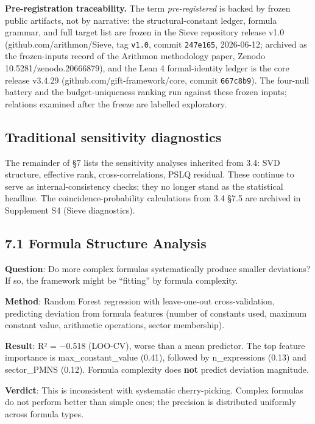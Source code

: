 \documentclass[11pt,a4paper]{article}
\begin{document}
\textbf{Pre-registration traceability.} The term \emph{pre-registered} is backed by frozen public artifacts, not by narrative: the structural-constant ledger, formula grammar, and full target list are frozen in the Sieve repository release v1.0 (github.com/arithmon/Sieve, tag \texttt{v1.\allowbreak{}0}, commit \texttt{247e165}, 2026-06-12; archived as the frozen-inputs record of the Arithmon methodology paper, Zenodo 10.5281/zenodo.20666879), and the Lean 4 formal-identity ledger is the core release v3.4.29 (github.com/gift-framework/core, commit \texttt{667c8b9}). The four-null battery and the budget-uniqueness ranking run against these frozen inputs; relations examined after the freeze are labelled exploratory.

\subsection{Traditional sensitivity diagnostics}\label{traditional-sensitivity-diagnostics}

The remainder of §7 lists the sensitivity analyses inherited from 3.4: SVD structure, effective rank, cross-correlations, PSLQ residual. These continue to serve as internal-consistency checks; they no longer stand as the statistical headline. The coincidence-probability calculations from 3.4 §7.5 are archived in Supplement S4 (Sieve diagnostics).

\subsection{7.1 Formula Structure Analysis}\label{formula-structure-analysis}

\textbf{Question}: Do more complex formulas systematically produce smaller deviations? If so, the framework might be ``fitting'' by formula complexity.

\textbf{Method}: Random Forest regression with leave-one-out cross-validation, predicting \textbar deviation\textbar{} from formula features (number of constants used, maximum constant value, arithmetic operations, sector membership).

\textbf{Result}: R² = −0.518 (LOO-CV), worse than a mean predictor. The top feature importance is max\_\allowbreak{}constant\_\allowbreak{}value (0.41), followed by n\_\allowbreak{}expressions (0.13) and sector\_\allowbreak{}PMNS (0.12). Formula complexity does \textbf{not} predict deviation magnitude.

\textbf{Verdict}: This is inconsistent with systematic cherry-picking. Complex formulas do not perform better than simple ones; the precision is distributed uniformly across formula types.
\end{document}
